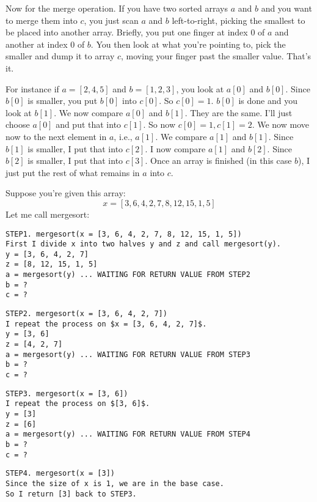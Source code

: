 Now for the merge operation.
If you have two sorted arrays $a$ and $b$ and you want to 
merge them into $c$,
you just scan $a$ and $b$ left-to-right,
picking the smallest to be placed into another array.
Briefly, you put one finger at index $0$ of $a$ and 
another at index $0$ of $b$.
You then look at what you're pointing to,
pick the smaller and dump it to array $c$,
moving your finger past the smaller value.
That's it.

For instance if $a = [2,4,5]$ and $b=[1,2,3]$,
you look at $a[0]$ and $b[0]$.
Since $b[0]$ is smaller, you put $b[0]$ into $c[0]$.
So $c[0] = 1$. $b[0]$ is done and you look at $b[1]$.
We now compare $a[0]$ and $b[1]$. They are the same.
I'll just choose $a[0]$ and put that into $c[1]$.
So now $c[0]=1, c[1]=2$. We now move now to the next element in $a$,
i.e., $a[1]$. We compare $a[1]$ and $b[1]$.
Since $b[1]$ is smaller, I put that into $c[2]$.
I now compare $a[1]$ and $b[2]$.
Since $b[2]$ is smaller, I put that into $c[3]$.
Once an array is finished (in this case $b$), I just put the rest
of what remains in $a$ into $c$.





Suppose you're given this array:
\[
x = [3, 6, 4, 2, 7, 8, 12, 15, 1, 5]
\]
Let me call mergesort:

\begin{Verbatim}[frame=single, fontsize=\footnotesize]
STEP1. mergesort(x = [3, 6, 4, 2, 7, 8, 12, 15, 1, 5])
First I divide x into two halves y and z and call mergesort(y).
y = [3, 6, 4, 2, 7]
z = [8, 12, 15, 1, 5]
a = mergesort(y) ... WAITING FOR RETURN VALUE FROM STEP2
b = ?
c = ?
\end{Verbatim}

\begin{Verbatim}[frame=single, fontsize=\footnotesize]
STEP2. mergesort(x = [3, 6, 4, 2, 7])
I repeat the process on $x = [3, 6, 4, 2, 7]$.
y = [3, 6]
z = [4, 2, 7]
a = mergesort(y) ... WAITING FOR RETURN VALUE FROM STEP3
b = ?
c = ?
\end{Verbatim}

\begin{Verbatim}[frame=single, fontsize=\footnotesize]
STEP3. mergesort(x = [3, 6])
I repeat the process on $[3, 6]$.
y = [3]
z = [6]
a = mergesort(y) ... WAITING FOR RETURN VALUE FROM STEP4
b = ?
c = ?
\end{Verbatim}

\begin{Verbatim}[frame=single, fontsize=\footnotesize]
STEP4. mergesort(x = [3])
Since the size of x is 1, we are in the base case. 
So I return [3] back to STEP3.
\end{Verbatim}

